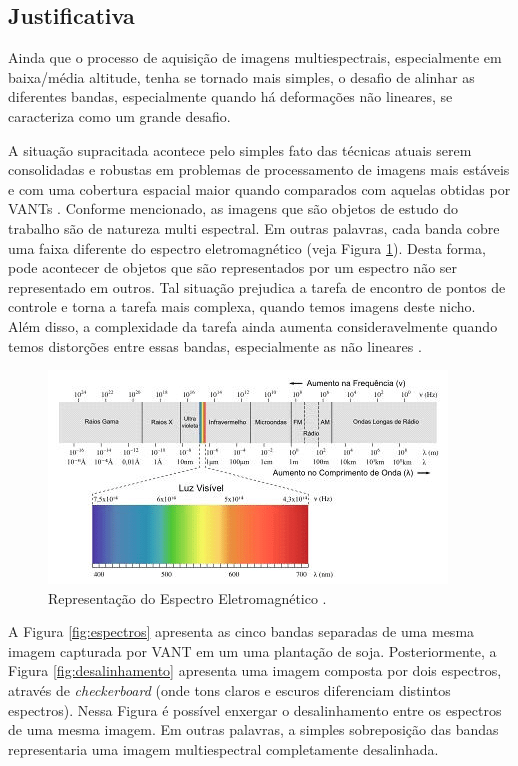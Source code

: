 \documentclass[12pt]{article}
\begin{document}
\subsection{Justificativa}
\label{sec:justificativa}

Ainda que o processo de aquisição de imagens multiespectrais, especialmente em baixa/média altitude, tenha se tornado mais simples, o desafio de alinhar as diferentes bandas, especialmente quando há deformações não lineares, se caracteriza como um grande desafio.

A situação supracitada acontece pelo simples fato das técnicas atuais serem consolidadas e robustas em problemas de processamento de imagens mais estáveis e com uma cobertura espacial maior quando comparados com aquelas obtidas por VANTs \cite{PANTANO, sensores2, sensores}. Conforme mencionado, as imagens que são objetos de estudo do trabalho são de natureza multi espectral. Em outras palavras, cada banda cobre uma faixa diferente do espectro eletromagnético (veja Figura \ref{fig:espectro_eletromagnetico}). Desta forma, pode acontecer de objetos que são representados por um espectro não ser representado em outros. Tal situação prejudica a tarefa de encontro de pontos de controle e torna a tarefa mais complexa, quando temos imagens deste nicho. Além disso, a complexidade da tarefa ainda aumenta consideravelmente quando temos distorções entre essas bandas, especialmente as não lineares \cite{dias2020uav, junior2019detection}.

\begin{figure}[!ht]
    \centering
    \includegraphics[width=0.6\textheight]{figures/espectro_eletromagnetico.png}
    \caption{Representação do Espectro Eletromagnético \cite{da2015light}.}
    \label{fig:espectro_eletromagnetico}
\end{figure}


A Figura \ref{fig:espectros} apresenta as cinco bandas separadas de uma mesma imagem capturada por VANT em um uma plantação de soja. Posteriormente, a Figura \ref{fig:desalinhamento} apresenta uma imagem composta por dois espectros, através de \textit{checkerboard} (onde tons claros e escuros diferenciam distintos espectros). Nessa Figura é possível enxergar o desalinhamento entre os espectros de uma mesma imagem. Em outras palavras, a simples sobreposição das bandas representaria uma imagem multiespectral completamente desalinhada.  
\end{document}
